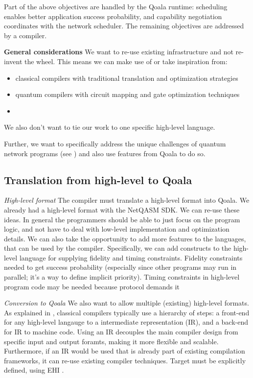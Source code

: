 
Part of the above objectives are handled by the Qoala runtime: scheduling enables better application success probability, and capability negotiation coordinates with the network scheduler.
The remaining objectives are addressed by a compiler.

\textbf{General considerations}
We want to re-use existing infrastructure and not re-invent the wheel. This means we can make use of or take inspiration from:
\begin{itemize}
  \item classical compilers with traditional translation and optimization strategies
  \item quantum compilers with circuit mapping and gate optimization techniques
  \item {}
\end{itemize}

We also don't want to tie our work to one specific high-level language.

Further, we want to specifically address the unique challenges of quantum network programs (see ) and also use features from Qoala to do so.


\subsection{Translation from high-level to Qoala}
\textit{High-level format}
The compiler must translate a high-level format into Qoala.
We already had a high-level format with the NetQASM SDK.
We can re-use these ideas.
In general the programmers should be able to just focus on the program logic, and not have to deal with low-level implementation and optimization details.
We can also take the opportunity to add more features to the languages, that can be used by the compiler.
Specifically, we can add constructs to the high-level language for supplying fidelity and timing constraints.
Fidelity constraints needed to get success probability (especially since other programs may run in parallel; it's a way to define implicit priority).
Timing constraints in high-level program code may be needed because protocol demands it

\textit{Conversion to Qoala}
We also want to allow multiple (existing) high-level formats.
As explained in , classical compilers typically use a hierarchy of steps: a front-end for any high-level langauge to a intermediate representation (IR), and a back-end for IR to machine code.
Using an IR decouples the main compiler design from specific input and output foramts, making it more flexible and scalable.
Furthermore, if an IR would be used that is already part of existing compilation frameworks, it can re-use existing compiler techniques.
Target must be explicitly defined, using EHI .


